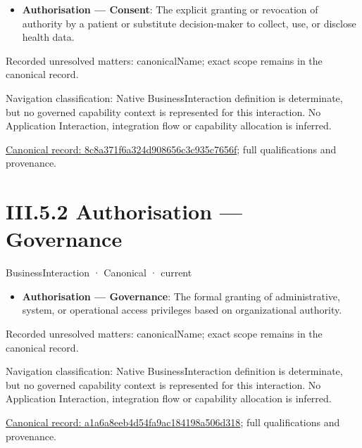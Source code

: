\begin{itemize}


\item \textbf{Authorisation — Consent}: The explicit granting or revocation of authority by a patient or substitute decision-maker to collect, use, or disclose health data.

\end{itemize}

{\small Recorded unresolved matters: canonicalName; exact scope remains in the canonical record.}\par
{\small Navigation classification: Native BusinessInteraction definition is determinate, but no governed capability context is represented for this interaction. No Application Interaction, integration flow or capability allocation is inferred.}\par
{\footnotesize \href{../../../../../../../continuum/business/business-interaction/8c8a371f6a324d908656c3c935c7656f.md}{Canonical record: 8c8a371f6a324d908656c3c935c7656f}; full qualifications and provenance.}\par
\section*{III.5.2 Authorisation — Governance}
\label{navigation:III.5.2}

\label{element:a1a6a8eeb4d54fa9ac184198a506d318}
{\small BusinessInteraction · Canonical · current}\par

\begin{itemize}


\item \textbf{Authorisation — Governance}: The formal granting of administrative, system, or operational access privileges based on organizational authority.

\end{itemize}

{\small Recorded unresolved matters: canonicalName; exact scope remains in the canonical record.}\par
{\small Navigation classification: Native BusinessInteraction definition is determinate, but no governed capability context is represented for this interaction. No Application Interaction, integration flow or capability allocation is inferred.}\par
{\footnotesize \href{../../../../../../../continuum/business/business-interaction/a1a6a8eeb4d54fa9ac184198a506d318.md}{Canonical record: a1a6a8eeb4d54fa9ac184198a506d318}; full qualifications and provenance.}\par
